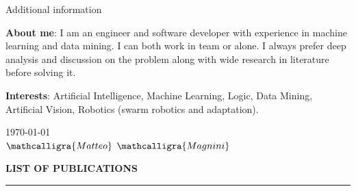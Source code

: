 \documentclass{resume} %
\begin{document}
    
    
    \begin{rSection}{Additional information}
        
        \item \textbf{About me}: I am an engineer and software developer with experience in machine learning and data mining. I can both work in team or alone. I always prefer deep analysis and discussion on the problem along with wide research in literature before solving it.
        
        \item \textbf{Interests}: Artificial Intelligence, Machine Learning, Logic, Data Mining, Artificial Vision, Robotics (swarm robotics and adaptation).
        
    \end{rSection}
    
    \vspace{2em} %
    \begin{flushright}
        \today
        \\
        \vspace{1em}
        \Large$\mathcalligra{Matteo}$  $\mathcalligra{Magnini}$
        
    \end{flushright}

    \pagebreak
    \MakeUppercase{\bf List of Publications} %
    \sectionlineskip
    \hrule %
    \vspace{-1cm}
    \nocite{*}
     
    \renewcommand\refname{}
    
    
\end{document}
